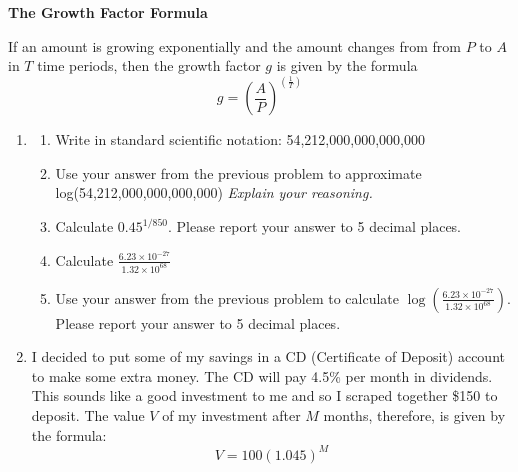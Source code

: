 \documentclass[12pt]{article}
\begin{document}
 \vspace{.2in}
 
 \begin{center}
\textbf{The Growth Factor Formula}
\vspace{.1in}

If an amount is growing exponentially and the amount changes from from $P$ to $A$ \\ in $T$ time periods, then the growth factor $g$ is given by the formula $$g=\left(\frac{A}{P}\right)^{\left(\frac{1}{T}\right)}$$

 \end{center}

\hrulefill

\newpage

\begin{enumerate}
\item \begin{enumerate}
\item Write in standard scientific notation:  54,212,000,000,000,000
\vfill
\item Use your answer from the previous problem to approximate log(54,212,000,000,000,000)  \emph{Explain your reasoning.}
\vfill
\item Calculate $0.45^{1/850}$.   Please report your answer to 5 decimal places.
\vfill
\item Calculate $\displaystyle \frac{6.23 \times 10^{-27}}{1.32 \times 10^{68}} $
\vfill
\item Use your answer from the previous problem to calculate $\displaystyle \log \left( \frac{6.23 \times 10^{-27}}{1.32 \times 10^{68}} \right) $.   Please report your answer to 5 decimal places.
\vfill
\end{enumerate}

\newpage
\item I decided to put some of my savings in a CD (Certificate of Deposit) account to make some extra money.  The CD will pay 4.5\% per month in dividends.  This sounds like a good investment to me and so I scraped together \$150 to deposit.  The value $V$ of my investment after $M$ months, therefore, is given by the formula: $$V=100(1.045)^M$$


\end{enumerate}
\end{document}
